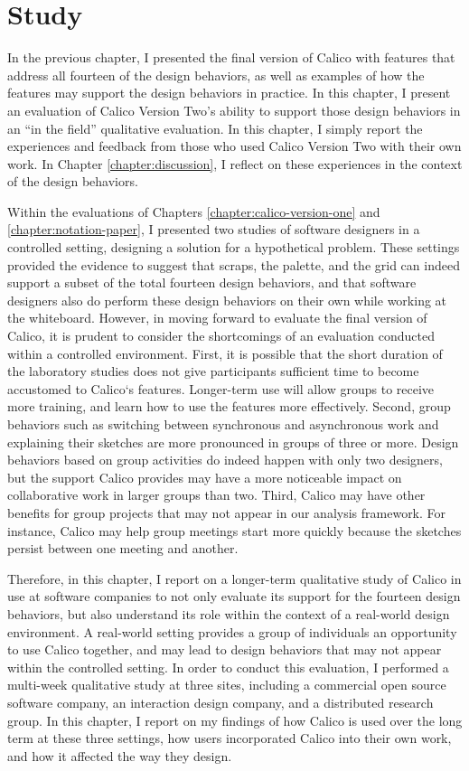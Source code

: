 \chapter{Study}
\label{chapter:evaluation}

In the previous chapter, I presented the final version of Calico with features that address all fourteen of the design behaviors, as well as examples of how the features may support the design behaviors in practice. In this chapter, I present an evaluation of Calico Version Two's ability to support those design behaviors in an ``in the field'' qualitative evaluation. In this chapter, I simply report the experiences and feedback from those who used Calico Version Two with their own work. In Chapter \ref{chapter:discussion}, I reflect on these experiences in the context of the design behaviors.

Within the evaluations of Chapters \ref{chapter:calico-version-one} and \ref{chapter:notation-paper}, I presented two studies of software designers in a controlled setting, designing a solution for a hypothetical problem. These settings provided the evidence to suggest that scraps, the palette, and the grid can indeed support a subset of the total fourteen design behaviors, and that software designers also do perform these design behaviors on their own while working at the whiteboard. However, in moving forward to evaluate the final version of Calico, it is prudent to consider the shortcomings of an evaluation conducted within a controlled environment. First, it is possible that the short duration of the laboratory studies does not give participants sufficient time to become accustomed to Calico`s features. Longer-term use will allow groups to receive more training, and learn how to use the features more effectively. Second, group behaviors such as switching between synchronous and asynchronous work and explaining their sketches are more pronounced in groups of three or more. Design behaviors based on group activities do indeed happen with only two designers, but the support Calico provides may have a more noticeable impact on collaborative work in larger groups than two. Third, Calico may have other benefits for group projects that may not appear in our analysis framework. For instance, Calico may help group meetings start more quickly because the sketches persist between one meeting and another.

Therefore, in this chapter, I report on a longer-term qualitative study of Calico in use at software companies to not only evaluate its support for the fourteen design behaviors, but also understand its role within the context of a real-world design environment. A real-world setting provides a group of individuals an opportunity to use Calico together, and may lead to design behaviors that may not appear within the controlled setting. In order to conduct this evaluation, I performed a multi-week qualitative study at three sites, including a commercial open source software company, an interaction design company, and a distributed research group. In this chapter, I report on my findings of how Calico is used over the long term at these three settings, how users incorporated Calico into their own work, and how it affected the way they design.

